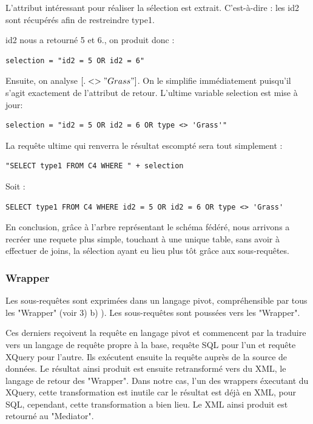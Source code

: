 L'attribut intéressant pour réaliser la sélection est extrait. C'est-à-dire : les id2 sont récupérés afin de restreindre type1.

id2 nous a retourné 5 et 6., on produit donc :
\begin{lstlisting}
selection = "id2 = 5 OR id2 = 6"
\end{lstlisting}

Ensuite, on analyse $[. <> "Grass"]$. On le simplifie immédiatement puisqu'il s'agit exactement de l'attribut de retour. L'ultime variable selection est mise à jour:
\begin{lstlisting}
selection = "id2 = 5 OR id2 = 6 OR type <> 'Grass'"
\end{lstlisting}

La requête ultime qui renverra le résultat escompté sera tout simplement :

\begin{lstlisting}
"SELECT type1 FROM C4 WHERE " + selection
\end{lstlisting}

Soit :

\begin{lstlisting}
SELECT type1 FROM C4 WHERE id2 = 5 OR id2 = 6 OR type <> 'Grass'
\end{lstlisting}
En conclusion, grâce à l'arbre représentant le schéma fédéré, nous arrivons a recréer une requete plus simple, touchant à une unique table,  sans avoir à effectuer de joins, la sélection ayant eu lieu plus tôt grâce aux sous-requêtes.

\subsubsection{Wrapper}

Les sous-requêtes sont exprimées dans un langage pivot, compréhensible par tous les "Wrapper" (voir 3) b) ). Les sous-requêtes sont poussées vers les "Wrapper".

Ces derniers reçoivent la requête en langage pivot et commencent par la traduire vers un langage de requête propre à la base, requête SQL pour l'un et requête XQuery pour l'autre. Ils exécutent ensuite la requête auprès de la source de données. Le résultat ainsi produit est ensuite retransformé vers du XML, le langage de retour des "Wrapper". Dans notre cas, l'un des wrappers éxecutant du XQuery, cette transformation est inutile car le résultat est déjà en XML, pour SQL, cependant, cette transformation a bien lieu. Le XML ainsi produit est retourné au "Mediator".

